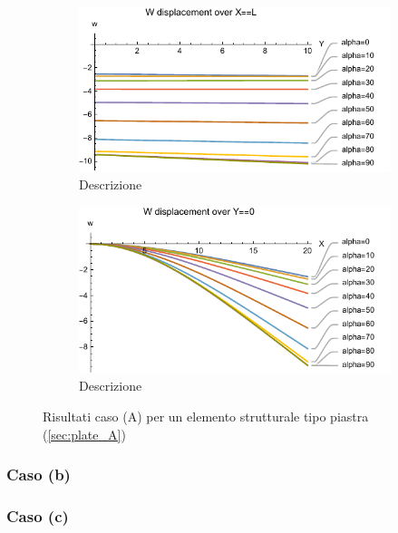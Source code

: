 \documentclass[a4paper,num-refs]{oup-contemporary}
\begin{document}
\begin{figure}[bt!]
\begin{subfigure}[t]{0.45\textwidth}
	\end{subfigure}
	\hfill
	\begin{subfigure}[t]{0.45\textwidth}
		\centering
		\includegraphics[width=\textwidth]{W_Y=.pdf}
		\caption{Descrizione}
		
	\end{subfigure}
	\hfill
	\begin{subfigure}[t]{0.45\textwidth}
		\centering
		\includegraphics[width=\textwidth]{W_X=.pdf}
		\caption{Descrizione}
		
	\end{subfigure}
	\hfill
	\caption{Risultati caso (A) per un elemento strutturale tipo piastra (\cref{sec:plate_A})}
	\label{fig:plate_A}
\end{figure}

\textcolor{blue}{\lipsum[1-2]}


\subsubsection{Caso (b)}
\textcolor{blue}{\lipsum[1-2]}
\subsubsection{Caso (c)}
\textcolor{blue}{\lipsum[1-2]}
\end{document}

